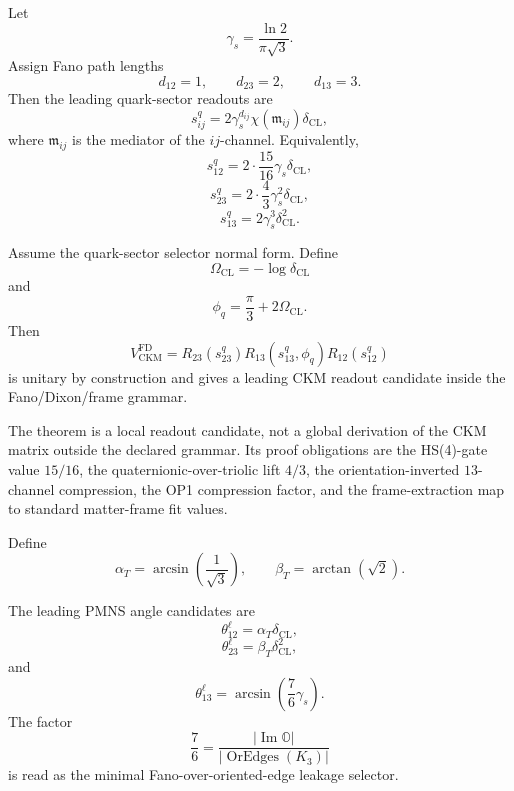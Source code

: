\begin{lemma}
Let
\[
  \gamma_s=\frac{\ln2}{\pi\sqrt3}.
\]
Assign Fano path lengths
\[
  d_{12}=1,
  \qquad
  d_{23}=2,
  \qquad
  d_{13}=3.
\]
Then the leading quark-sector readouts are
\[
  s_{ij}^{q}
  =
  2\gamma_s^{d_{ij}}
  \chi(\mathfrak m_{ij})
  \delta_{\mathrm{CL}},
\]
where \(\mathfrak m_{ij}\) is the mediator of the \(ij\)-channel.  Equivalently,
\[
  s_{12}^{q}
  =
  2\cdot\frac{15}{16}\gamma_s\delta_{\mathrm{CL}},
\]
\[
  s_{23}^{q}
  =
  2\cdot\frac43\gamma_s^2\delta_{\mathrm{CL}},
\]
\[
  s_{13}^{q}
  =
  2\gamma_s^3\delta_{\mathrm{CL}}^2.
\]
\end{lemma}

\begin{theorem}
Assume the quark-sector selector normal form.  Define
\[
  \Omega_{\mathrm{CL}}=-\log\delta_{\mathrm{CL}}
\]
and
\[
  \phi_q
  =
  \frac{\pi}{3}+2\Omega_{\mathrm{CL}}.
\]
Then
\[
  V_{\mathrm{CKM}}^{\mathrm{FD}}
  =
  R_{23}(s_{23}^{q})
  R_{13}(s_{13}^{q},\phi_q)
  R_{12}(s_{12}^{q})
\]
is unitary by construction and gives a leading CKM readout candidate inside the Fano/Dixon/frame grammar.
\end{theorem}

\begin{remark}
The theorem is a local readout candidate, not a global derivation of the CKM matrix outside the declared grammar.  Its proof obligations are the HS(4)-gate value \(15/16\), the quaternionic-over-triolic lift \(4/3\), the orientation-inverted \(13\)-channel compression, the OP1 compression factor, and the frame-extraction map to standard matter-frame fit values.
\end{remark}

\begin{definition}
Define
\[
  \alpha_T=\arcsin\left(\frac1{\sqrt3}\right),
  \qquad
  \beta_T=\arctan(\sqrt2).
\]
\end{definition}

\begin{lemma}
The leading PMNS angle candidates are
\[
  \theta_{12}^{\ell}
  =
  \alpha_T\delta_{\mathrm{CL}},
\]
\[
  \theta_{23}^{\ell}
  =
  \beta_T\delta_{\mathrm{CL}}^2,
\]
and
\[
  \theta_{13}^{\ell}
  =
  \arcsin\left(\frac76\gamma_s\right).
\]
The factor
\[
  \frac76
  =
  \frac{|\operatorname{Im}\mathbb O|}
       {|\operatorname{OrEdges}(K_3)|}
\]
is read as the minimal Fano-over-oriented-edge leakage selector.
\end{lemma}

